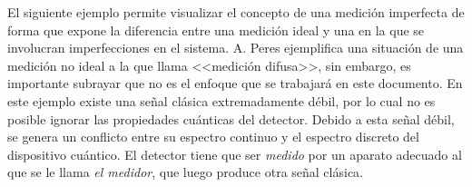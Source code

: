 El siguiente ejemplo permite visualizar el concepto de una medición imperfecta de forma que expone la diferencia entre una medición ideal y una en la que se involucran imperfecciones en el sistema.
 A. Peres {\cite{peres1997quantum}} ejemplifica una situación de una medición no
ideal a la que llama <<medición difusa>>, sin embargo, es importante subrayar
que no es el enfoque que se trabajará en este documento. En este ejemplo existe
una señal clásica extremadamente débil, por lo cual no es posible ignorar las propiedades cuánticas del detector. Debido a esta señal débil, se genera un conflicto entre su espectro continuo y el espectro discreto del  dispositivo cuántico.
El detector tiene que ser \textit{medido} por un aparato adecuado al que se le llama \textit{el medidor}, que luego produce otra señal clásica.













